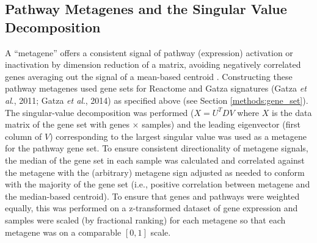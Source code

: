\subsection{Pathway Metagenes and the Singular Value Decomposition} \label{methods:metagene}
A ``metagene'' offers a consistent signal of pathway (expression) activation or inactivation by dimension reduction of a matrix, avoiding negatively correlated genes averaging out the signal of a mean-based centroid \citep{Huang2003}. Constructing these pathway metagenes used gene sets for Reactome and Gatza signatures (Gatza \textit{et al}., 2011; Gatza \textit{et al}., 2014) as specified above (see Section \ref{methods:gene_set}). The singular-value decomposition was performed ($X = U^{T} D V$ where $X$ is the data matrix of the gene set with genes $\times$ samples) and the leading eigenvector (first column of $V$) corresponding to the largest singular value was used as a metagene for the pathway gene set. To ensure consistent directionality of metagene signals, the median of the gene set in each sample was calculated and correlated against the metagene with the (arbitrary) metagene sign adjusted as needed to conform with the majority of the gene set (i.e., positive correlation between metagene and the median-based centroid). To ensure that genes and pathways were weighted equally, this was performed on a z-transformed dataset of gene expression and samples were scaled (by fractional ranking) for each metagene so that each metagene was on a comparable $[0,1]$ scale. 

